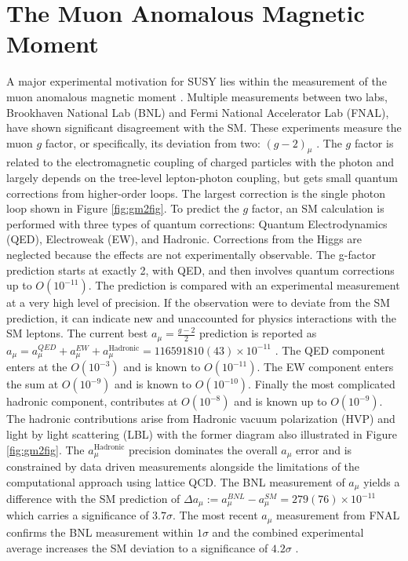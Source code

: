 \section{The Muon Anomalous Magnetic Moment}

A major experimental motivation for SUSY lies within the measurement of the muon anomalous magnetic moment \cite{Bagnaschi:2022qhb}.  Multiple measurements between two labs, Brookhaven National Lab (BNL) and Fermi National Accelerator Lab (FNAL), have shown significant disagreement with the SM. These experiments measure the muon $g$ factor, or specifically, its deviation from two: $(g-2)_\mu$ .  The $g$ factor is related to the electromagnetic coupling of charged particles with the photon and largely depends on the tree-level lepton-photon coupling, but gets small quantum corrections from higher-order loops. The largest correction is the single photon loop shown in Figure \ref{fig:gm2fig}. To predict the $g$ factor, an SM calculation is performed with three types of quantum corrections: Quantum Electrodynamics (QED), Electroweak (EW), and Hadronic. Corrections from the Higgs are neglected because the effects are not experimentally observable. %
The g-factor prediction starts at exactly 2, with QED, and then involves quantum corrections up to $O(10^{-11})$. The prediction is compared with an experimental measurement at a very high level of precision. If the observation were to deviate from the SM prediction, it can indicate new and unaccounted for physics interactions with the SM leptons.
The current best $a_\mu = \frac{g-2}{2}$ prediction is reported as $a_\mu= a_\mu^{QED}+ a_\mu^{EW}+a_\mu^{\text{Hadronic}} =  116 591 810(43) \times 10^{-11}$ \cite{Muong-2:2021ojo}.
The QED component enters at the $O(10^{-3})$ and is known to $O(10^{-11})$. The EW component enters the sum at $O(10^{-9})$ and is known to $O(10^{-10})$. Finally the most complicated hadronic component, contributes at $O(10^{-8})$ and is known up to $O(10^{-9})$. The hadronic contributions arise from Hadronic vacuum polarization (HVP) and light by light scattering (LBL) with the former diagram also illustrated in Figure \ref{fig:gm2fig}. The $a_\mu^{\text{Hadronic}}$ precision dominates the overall $a_\mu$ error and is constrained by data driven measurements alongside the limitations of the computational approach using lattice QCD. The BNL measurement of $a_\mu$ yields a difference with the SM prediction of $\Delta a_\mu := a_\mu^{BNL} - a_\mu^{SM} = 279(76) \times 10^{-11}$ which carries a significance of $3.7\sigma$. The most recent $a_\mu$ measurement from FNAL confirms the BNL measurement within $1\sigma$ and the combined experimental average increases the SM deviation to a significance of $4.2\sigma$ \cite{Muong-2:2021ojo}.


